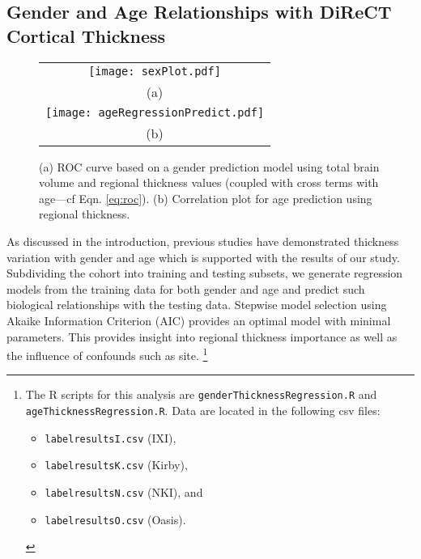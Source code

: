 \subsection{Gender and Age Relationships with DiReCT Cortical Thickness}

\begin{figure}[htb]
  \centering
  \begin{tabular}{c}
  \texttt{[image: sexPlot.pdf]} \\
  (a) \\
  \texttt{[image: ageRegressionPredict.pdf]} \\
  (b) 
  \end{tabular}
  \caption{(a) ROC curve based on a gender prediction model using total brain volume and regional thickness values (coupled with cross terms with age---cf Eqn. \ref{eq:roc}).  
  (b) Correlation plot for age prediction using regional thickness.
  }
  \label{fig:sexROC}
\end{figure}

As discussed in the introduction, previous studies have demonstrated 
thickness variation with gender and age which is supported with
the results of our study.  Subdividing the cohort into training and
testing subsets, we generate regression models from the training data
for both gender and age and predict such biological relationships with 
the testing data. Stepwise model selection using Akaike Information Criterion
(AIC) provides an optimal model with minimal parameters.  This provides 
insight into regional thickness importance as well
as the influence of confounds such as site.%
\footnote{
The R scripts for this analysis are {\tt genderThicknessRegression.R} and
{\tt ageThicknessRegression.R}.  Data are located in the following csv files: 
\begin{itemize}
\item {\tt labelresultsI.csv} (IXI), 
\item {\tt labelresultsK.csv} (Kirby),
\item {\tt labelresultsN.csv} (NKI), and
\item {\tt labelresultsO.csv} (Oasis).
\end{itemize}
}


